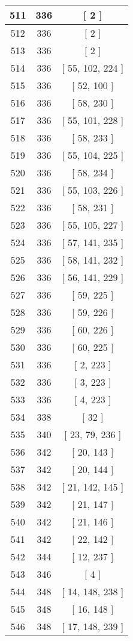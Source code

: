 \begin{center}
\begin{longtable}[H]{|| c c c ||}
511 & 336 & [ 2 ]
\\\hline
512 & 336 & [ 2 ]
\\\hline
513 & 336 & [ 2 ]
\\\hline
514 & 336 & [ 55, 102, 224 ]
\\\hline
515 & 336 & [ 52, 100 ]
\\\hline
516 & 336 & [ 58, 230 ]
\\\hline
517 & 336 & [ 55, 101, 228 ]
\\\hline
518 & 336 & [ 58, 233 ]
\\\hline
519 & 336 & [ 55, 104, 225 ]
\\\hline
520 & 336 & [ 58, 234 ]
\\\hline
521 & 336 & [ 55, 103, 226 ]
\\\hline
522 & 336 & [ 58, 231 ]
\\\hline
523 & 336 & [ 55, 105, 227 ]
\\\hline
524 & 336 & [ 57, 141, 235 ]
\\\hline
525 & 336 & [ 58, 141, 232 ]
\\\hline
526 & 336 & [ 56, 141, 229 ]
\\\hline
527 & 336 & [ 59, 225 ]
\\\hline
528 & 336 & [ 59, 226 ]
\\\hline
529 & 336 & [ 60, 226 ]
\\\hline
530 & 336 & [ 60, 225 ]
\\\hline
531 & 336 & [ 2, 223 ]
\\\hline
532 & 336 & [ 3, 223 ]
\\\hline
533 & 336 & [ 4, 223 ]
\\\hline
534 & 338 & [ 32 ]
\\\hline
535 & 340 & [ 23, 79, 236 ]
\\\hline
536 & 342 & [ 20, 143 ]
\\\hline
537 & 342 & [ 20, 144 ]
\\\hline
538 & 342 & [ 21, 142, 145 ]
\\\hline
539 & 342 & [ 21, 147 ]
\\\hline
540 & 342 & [ 21, 146 ]
\\\hline
541 & 342 & [ 22, 142 ]
\\\hline
542 & 344 & [ 12, 237 ]
\\\hline
543 & 346 & [ 4 ]
\\\hline
544 & 348 & [ 14, 148, 238 ]
\\\hline
545 & 348 & [ 16, 148 ]
\\\hline
546 & 348 & [ 17, 148, 239 ]

\end{longtable}
\end{center}
